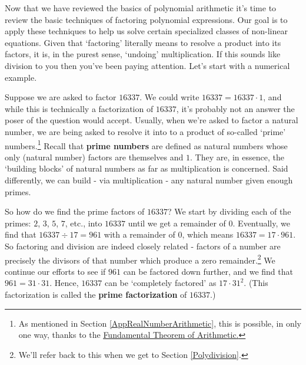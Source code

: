 \documentclass{ximera}
\begin{document}
	\author{Stitz-Zeager}




\setcounter{footnote}{0}

\label{AppFactoring}

Now that we have reviewed the basics of polynomial arithmetic it's time to review the basic techniques of factoring polynomial expressions.  Our goal is to apply these techniques to help us solve certain specialized classes of non-linear equations.  Given that `factoring' literally means to resolve a product into its factors, it is, in the purest sense, `undoing' multiplication.  If this sounds like division to you then you've been paying attention.  Let's start with a numerical example.  

\medskip

Suppose we are asked to factor $16337$.  We could write $16337 = 16337 \cdot 1$, and while this is technically a factorization of $16337$,  it's probably not an answer the poser of the question would accept.  Usually, when we're asked to factor a natural number, we are being asked to resolve it into to a product of so-called 	`prime' numbers.\footnote{As mentioned in Section \ref{AppRealNumberArithmetic}, this is possible, in only one way, thanks to the \href{https://en.wikipedia.org/wiki/Fundamental_theorem_of_arithmetic}{\underline{Fundamental Theorem of Arithmetic}.}}  Recall that \textbf{prime numbers} are defined as natural numbers whose only (natural number) factors are themselves and $1$. They are, in essence, the `building blocks' of natural numbers as far as multiplication is concerned.  Said differently, we can build - via multiplication - any natural number given enough primes.  

\medskip

So how do we find the prime factors of $16337$?  We start by dividing each of the primes: $2$, $3$, $5$, $7$, etc., into $16337$ until we get a remainder of $0$.  Eventually, we find that $16337 \div 17 = 961$ with a remainder of $0$, which means $16337 = 17 \cdot 961$.  So factoring and division are indeed closely related - factors of a number are precisely the divisors of that number which produce a zero remainder.\footnote{We'll refer back to this when we get to Section \ref{Polydivision}.}  We continue our efforts to see if $961$ can be factored down further, and we find that $961 = 31 \cdot 31$.  Hence, $16337$ can be `completely factored' as $17 \cdot 31^2$.  (This factorization is called the \textbf{prime factorization} of $16337$.)  
\end{document}
